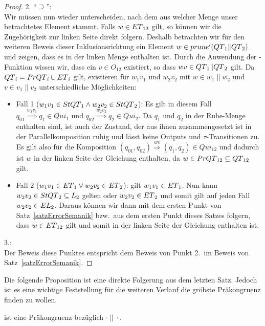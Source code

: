 \begin{proof}
  2. ``$\supseteq$'':\\
  Wir müssen nun wieder unterscheiden, nach dem aus welcher Menge unser
  betrachtetes Element stammt. Falls $w\in ET{}_{12}$ gilt, so können wir die
  Zugehörigkeit zur linken Seite direkt folgern. Deshalb betrachten wir für den
  weiteren Beweis dieser
  Inklusionsrichtung ein Element $w\in prune' (QT{}_1\|QT{}_2)$ und
  zeigen, dass es in der linken Menge enthalten ist. Durch die Anwendung der
  \prunenew{}-Funktion wissen wir, dass ein $v\in O_{12}$ existiert, so dass
  $wv\in QT{}_1\|QT{}_2$ gilt. Da $QT{}_i = PrQT{}_i\cup ET{}_i$ gilt,
  existieren für $w_1v_1$ und $w_2v_2$ mit $w\in w_1\| w_2$ und $v\in v_1\|
  v_2$ unterschiedliche Möglichkeiten:
  \begin{itemize}
    \item Fall 1 ($w_1v_1\in StQT{}_1\wedge w_2v_2\in StQT{}_2$): Es gilt in diesem
      Fall $q_{01} \overset{w_1v_1}{\Rightarrow} q_1\in Qui_1$ und $q_{02}
      \overset{w_2v_2}{\Rightarrow} q_2\in Qui_2$. Da $q_1$ und $q_2$ in der
      Ruhe-Menge enthalten sind, ist auch der Zustand, der aus ihnen
      zusammengesetzt ist in der Parallelkomposition ruhig und lässt keine
      Outputs und $\tau$-Transitionen zu. Es gilt also für die Komposition
      $(q_{01},q_{02}) \overset{wv}{\Rightarrow} (q_1,q_2)\in Qui_{12}$ und
      dadurch ist $w$ in der linken Seite der Gleichung enthalten, da $w\in
      PrQT{}_{12}\subseteq QT{}_{12}$ gilt.
    \item Fall 2 ($w_1v_1\in ET{}_1\vee w_2v_2\in ET{}_2$): \OBdA{} gilt
      $w_1v_1\in ET{}_1$. Nun kann $w_2v_2\in StQT{}_2\subseteq L_2$ gelten
      oder $w_2v_2\in ET{}_2$ und somit gilt auf jeden Fall $w_2v_2\in
      EL{}_2$. Daraus können wir dann mit dem ersten Punkt von
      Satz~\ref{satzErrorSemanik} bzw.\ aus dem ersten Punkt dieses Satzes
      folgern, dass $w\in ET{}_{12}$ gilt und somit in der linken Seite der
      Gleichung enthalten ist.
  \end{itemize}

  3.:\\
  Der Beweis diese Punktes entspricht dem Beweis von Punkt 2.\ im Beweis von
  Satz~\ref{satzErrorSemanik}.
\end{proof}

Die folgende Proposition ist eine direkte Folgerung aus dem letzten Satz.
Jedoch ist es eine wichtige Feststellung für die weiteren Verlauf die gröbste
Präkongruenz finden zu wollen.

\begin{prop}[Präkongruenz]
  \label{propQuiPrae}
  \QRel{} ist eine Präkongruenz bezüglich $\cdot\|\cdot$.
\end{prop}

